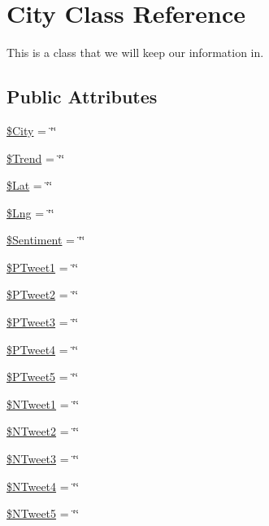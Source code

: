 \hypertarget{classCity}{}\section{City Class Reference}
\label{classCity}


This is a class that we will keep our information in.  


\subsection*{Public Attributes}
\begin{DoxyCompactItemize}
\item 
\hyperlink{classCity_a37b890581b830d6dcb43dee2d8c98463}{\$\+City} = \char`\"{}\char`\"{}
\item 
\hyperlink{classCity_a32e0805ba9ae11b3aa658d60029df1fc}{\$\+Trend} = \char`\"{}\char`\"{}
\item 
\hyperlink{classCity_af2b3e408999c8ab317e80a107c543dc4}{\$\+Lat} = \char`\"{}\char`\"{}
\item 
\hyperlink{classCity_a8df2449cae23d59eff5e5fa2747155e6}{\$\+Lng} = \char`\"{}\char`\"{}
\item 
\hyperlink{classCity_af303329814ddeefe78effa154adde16d}{\$\+Sentiment} = \char`\"{}\char`\"{}
\item 
\hyperlink{classCity_a634b09cf48f8fa468da296007d6ff327}{\$\+P\+Tweet1} = \char`\"{}\char`\"{}
\item 
\hyperlink{classCity_a7e3650629a6fa7bb4b774f68384001b1}{\$\+P\+Tweet2} = \char`\"{}\char`\"{}
\item 
\hyperlink{classCity_ae5e9c77c78862ab192db09266a9042f3}{\$\+P\+Tweet3} = \char`\"{}\char`\"{}
\item 
\hyperlink{classCity_a1c1e5c48b136d0c5bdc2a28401162bb5}{\$\+P\+Tweet4} = \char`\"{}\char`\"{}
\item 
\hyperlink{classCity_a015736b4b7e53f4a8fb4b8913879eda5}{\$\+P\+Tweet5} = \char`\"{}\char`\"{}
\item 
\hyperlink{classCity_af0ef76f4a336e0e471971cfdcc9a4da6}{\$\+N\+Tweet1} = \char`\"{}\char`\"{}
\item 
\hyperlink{classCity_a91717a27f9d2f1c3243fe1388a1013f4}{\$\+N\+Tweet2} = \char`\"{}\char`\"{}
\item 
\hyperlink{classCity_a766a7b2a383e4e36c67e01c8386b8468}{\$\+N\+Tweet3} = \char`\"{}\char`\"{}
\item 
\hyperlink{classCity_a9ea6a35aacc8be85c331143cde8a69c0}{\$\+N\+Tweet4} = \char`\"{}\char`\"{}
\item 
\hyperlink{classCity_a08dcb59ae220e7763f2f32ac63d89018}{\$\+N\+Tweet5} = \char`\"{}\char`\"{}
\end{DoxyCompactItemize}


